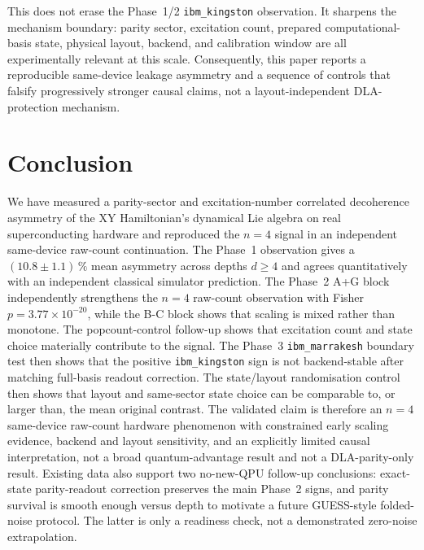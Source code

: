 \documentclass[reprint,aps,physrev,superscriptaddress,floatfix,longbibliography]{revtex4-2}
\begin{document}
This does not erase the Phase~1/2 \texttt{ibm\_kingston} observation.
It sharpens the mechanism boundary: parity sector, excitation count,
prepared computational-basis state, physical layout, backend, and
calibration window are all experimentally relevant at this scale.
Consequently, this paper reports a reproducible same-device leakage
asymmetry and a sequence of controls that falsify progressively
stronger causal claims, not a layout-independent DLA-protection
mechanism.

\section{Conclusion}

We have measured a parity-sector and excitation-number correlated
decoherence asymmetry of the XY Hamiltonian's dynamical Lie algebra
on real superconducting hardware and reproduced the $n=4$ signal in
an independent same-device raw-count continuation. The Phase~1
observation gives a
$(10.8 \pm 1.1)\,\%$ mean asymmetry across depths $d \ge 4$ and agrees
quantitatively with an independent classical simulator prediction.
The Phase~2 A+G block independently strengthens the $n=4$ raw-count
observation with Fisher $p=3.77\times10^{-20}$, while the B-C block
shows that scaling is mixed rather than monotone. The popcount-control
follow-up shows that excitation count and state choice materially
contribute to the signal. The Phase~3 \texttt{ibm\_marrakesh}
boundary test then shows that the positive \texttt{ibm\_kingston}
sign is not backend-stable after matching full-basis readout
correction. The state/layout randomisation control then shows that
layout and same-sector state choice can be comparable to, or larger
than, the mean original contrast. The validated claim is therefore an
$n=4$ same-device raw-count hardware phenomenon with constrained early
scaling evidence, backend and layout sensitivity, and an explicitly
limited causal interpretation, not a broad quantum-advantage result
and not a DLA-parity-only result.
Existing data also support two no-new-QPU follow-up conclusions:
exact-state parity-readout correction preserves the main Phase~2
signs, and parity survival is smooth enough versus depth to motivate
a future GUESS-style folded-noise protocol. The latter is only a
readiness check, not a demonstrated zero-noise extrapolation.

\end{document}
